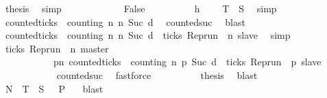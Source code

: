 \begin{isabellebody}
\ {\isacharquery}thesis\ \isamarkupfalse%
\ simp\isanewline
\ \ \ \ \isamarkupfalse%
\isanewline
\ \ \ \ \ \ \isamarkupfalse%
\ False\isanewline
\ \ \ \ \ \ \ \ \isamarkupfalse%
\ h\ \isamarkupfalse%
\ {}{\isacharcolon}{\isacartoucheopen}{\isasymrho}\ {\isasymin}\ {\isacharquery}T\ {\isasyminter}\ {\isacharquery}S{\isacartoucheclose}\ \isamarkupfalse%
\ simp\isanewline
\ \ \ \ \ \ \ \ \isamarkupfalse%
\ {\isacartoucheopen}{\isasymnot}counted{\isacharunderscore}ticks\ {\isasymrho}\ counting\ n\ n\ {\isacharparenleft}Suc\ d{\isacharparenright}{\isacartoucheclose}\ \isamarkupfalse%
\ counted{\isacharunderscore}suc\ \isamarkupfalse%
\ blast\isanewline
\ \ \ \ \ \ \ \ \isamarkupfalse%
\ {\isacartoucheopen}counted{\isacharunderscore}ticks\ {\isasymrho}\ counting\ n\ n\ {\isacharparenleft}Suc\ d{\isacharparenright}\ {\isasymlongrightarrow}\ ticks\ {\isacharparenleft}Rep{\isacharunderscore}run\ {\isasymrho}\ n\ slave{\isacharparenright}{\isacartoucheclose}\ \isamarkupfalse%
\ simp\isanewline
\ \ \ \ \ \ \ \ \isamarkupfalse%
\ {}\ \isamarkupfalse%
\ {\isacartoucheopen}ticks\ {\isacharparenleft}Rep{\isacharunderscore}run\ {\isasymrho}\ n\ master{\isacharparenright}\isanewline
\ \ \ \ \ \ \ \ \ \ {\isasymand}\ {\isacharparenleft}{\isasymforall}p{\isasymge}n{\isachardot}\ counted{\isacharunderscore}ticks\ {\isasymrho}\ counting\ n\ p\ {\isacharparenleft}Suc\ d{\isacharparenright}\ {\isasymlongrightarrow}\ ticks\ {\isacharparenleft}Rep{\isacharunderscore}run\ {\isasymrho}\ p\ slave{\isacharparenright}{\isacharparenright}{\isacartoucheclose}\isanewline
\ \ \ \ \ \ \ \ \ \ \isamarkupfalse%
\ counted{\isacharunderscore}suc\ \isamarkupfalse%
\ fastforce\isanewline
\ \ \ \ \ \ \ \ \isamarkupfalse%
\ {\isacharquery}thesis\ \isamarkupfalse%
\ blast\isanewline
\ \ \ \ \isamarkupfalse%
\isanewline
\ \ \isacommand{{\isacharbraceright}}\isamarkupfalse%
\ \isamarkupfalse%
\ {\isacartoucheopen}{\isacharquery}N\ {\isasymunion}\ {\isacharquery}T\ {\isasyminter}\ {\isacharquery}S\ {\isasymsubseteq}\ {\isacharbraceleft}{\isasymrho}{\isachardot}\ {\isacharquery}P\ {\isasymrho}{\isacharbraceright}{\isacartoucheclose}\ \isamarkupfalse%
\ blast\isanewline
{}\isamarkupfalse%
%
\endisatagproof
{\isafoldproof}%
%
\isadelimproof
\isanewline

\end{isabellebody}
